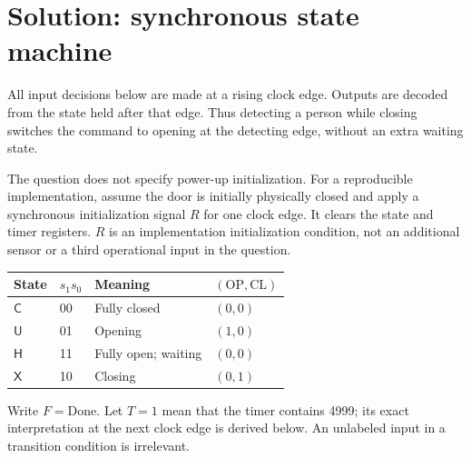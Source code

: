 \begin{center}
\end{center}

\section{Solution: synchronous state machine}
All input decisions below are made at a rising clock edge. Outputs are
decoded from the state held after that edge. Thus detecting a person while
closing switches the command to opening at the detecting edge, without an
extra waiting state.

The question does not specify power-up initialization. For a reproducible
implementation, assume the door is initially physically closed and apply
a synchronous initialization signal \(R\) for one clock edge. It clears
the state and timer registers. \(R\) is an implementation initialization
condition, not an additional sensor or a third operational input in the
question.

\begin{center}
\begin{tabular}{llll}
\toprule
State & \(s_1s_0\) & Meaning & \((\mathrm{OP},\mathrm{CL})\)\\
\midrule
\(\mathsf C\) & 00 & Fully closed & \((0,0)\)\\
\(\mathsf U\) & 01 & Opening & \((1,0)\)\\
\(\mathsf H\) & 11 & Fully open; waiting & \((0,0)\)\\
\(\mathsf X\) & 10 & Closing & \((0,1)\)\\
\bottomrule
\end{tabular}
\end{center}
Write \(F=\mathrm{Done}\). Let \(T=1\) mean that the timer contains 4999;
its exact interpretation at the next clock edge is derived below.
An unlabeled input in a transition condition is irrelevant.

